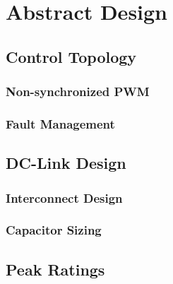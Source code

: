 \chapter{Abstract Design}

\section{Control Topology}

\subsection{Non-synchronized PWM}

\subsection{Fault Management}

\section{DC-Link Design}

\subsection{Interconnect Design}

\subsection{Capacitor Sizing}

\section{Peak Ratings}
